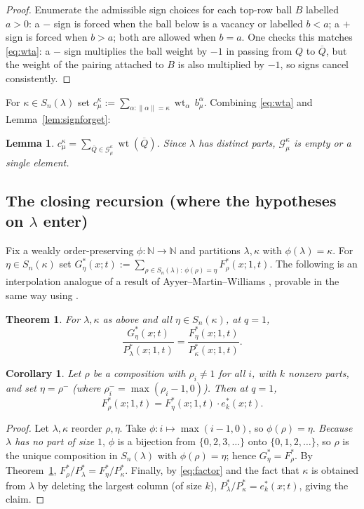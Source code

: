 \documentclass[11pt]{article}
\newcommand{\N}{\mathbb{N}}
\newcommand{\Snl}{S_n(\lambda)}
\newcommand{\wt}{\operatorname{wt}}
\newtheorem{theorem}{Theorem}
\newtheorem{lemma}{Lemma}
\newtheorem{corollary}{Corollary}
\theoremstyle{definition}
\begin{document}
\begin{proof}
Enumerate the admissible sign choices for each top-row ball $B$ labelled $a>0$:
a $-$ sign is forced when the ball below is a vacancy or labelled $b<a$; a $+$
sign is forced when $b>a$; both are allowed when $b=a$. One checks this matches
\eqref{eq:wta}: a $-$ sign multiplies the ball weight by $-1$ in passing from
$Q$ to $\overline Q$, but the weight of the pairing attached to $B$ is also
multiplied by $-1$, so signs cancel consistently.
\end{proof}

For $\kappa\in\Snl$ set $c^\kappa_\mu:=\sum_{\alpha:\|\alpha\|=\kappa}\wt_\alpha\,b^\alpha_\mu$.
Combining \eqref{eq:wta} and Lemma~\ref{lem:signforget}:

\begin{lemma}\label{lem:ckm}
$c^\kappa_\mu=\sum_{\overline Q\in\mathcal G^\kappa_\mu}\wt(\overline Q)$. Since $\lambda$ has distinct
parts, $\mathcal G^\kappa_\mu$ is empty or a single element.
\end{lemma}

\subsection*{The closing recursion (where the hypotheses on $\lambda$ enter)}

Fix a weakly order-preserving $\phi:\N\to\N$ and partitions $\lambda,\kappa$ with
$\phi(\lambda)=\kappa$. For $\eta\in S_n(\kappa)$ set
$G^*_\eta(x;t):=\sum_{\rho\in\Snl:\,\phi(\rho)=\eta}F^*_\rho(x;1,t)$. The following
is an interpolation analogue of a result of Ayyer--Martin--Williams
\cite{AMW25}, provable in the same way using \cite{AS19}.

\begin{theorem}\label{thm:G}
For $\lambda,\kappa$ as above and all $\eta\in S_n(\kappa)$, at $q=1$,
\[
\frac{G^*_\eta(x;t)}{P^*_\lambda(x;1,t)}=\frac{F^*_\eta(x;1,t)}{P^*_\kappa(x;1,t)} .
\]
\end{theorem}

\begin{corollary}\label{cor:rec}
Let $\rho$ be a composition with $\rho_i\ne1$ for all $i$, with $k$ nonzero
parts, and set $\eta=\rho^-$ (where $\rho^-_i=\max(\rho_i-1,0)$). Then at $q=1$,
\[
F^*_\rho(x;1,t)=F^*_\eta(x;1,t)\cdot e^*_k(x;t).
\]
\end{corollary}

\begin{proof}
Let $\lambda,\kappa$ reorder $\rho,\eta$. Take $\phi:i\mapsto\max(i-1,0)$, so
$\phi(\rho)=\eta$. \emph{Because $\lambda$ has no part of size $1$}, $\phi$ is a
bijection from $\{0,2,3,\dots\}$ onto $\{0,1,2,\dots\}$, so $\rho$ is the unique
composition in $\Snl$ with $\phi(\rho)=\eta$; hence $G^*_\eta=F^*_\rho$. By
Theorem~\ref{thm:G},
$F^*_\rho/P^*_\lambda=F^*_\eta/P^*_\kappa$. Finally, by \eqref{eq:factor} and the
fact that $\kappa$ is obtained from $\lambda$ by deleting the largest column (of
size $k$), $P^*_\lambda/P^*_\kappa=e^*_k(x;t)$, giving the claim.
\end{proof}
\end{document}

